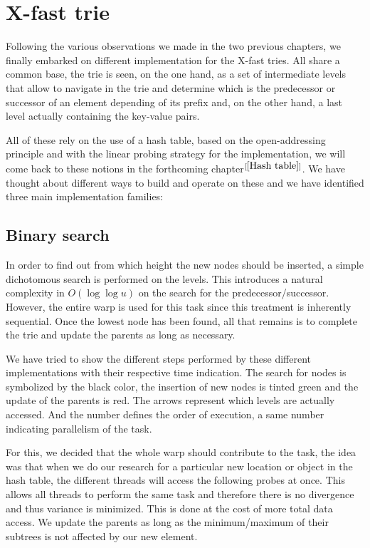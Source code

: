 
\section{X-fast trie}

Following the various observations we made in the two previous chapters, we finally embarked on different implementation for the X-fast tries. All share a common base, the trie is seen, on the one hand, as a set of intermediate levels that allow to navigate in the trie and determine which is the predecessor or successor of an element depending of its prefix and, on the other hand, a last level actually containing the key-value pairs.

All of these rely on the use of a hash table, based on the open-addressing principle and with the linear probing strategy for the implementation, we will come back to these notions in the forthcoming chapter$ ^{[\ref{Hash table}]}$. We have thought about different ways to build and operate on these and we have identified three main implementation families:

\subsection{Binary search}

In order to find out from which height the new nodes should be inserted, a simple dichotomous search is performed on the levels. This introduces a natural complexity in $O(\log \log u)$ on the search for the predecessor/successor. However, the entire warp is used for this task since this treatment is inherently sequential. Once the lowest node has been found, all that remains is to complete the trie and update the parents as long as necessary.

We have tried to show the different steps performed by these different implementations with their respective time indication. The search for nodes is symbolized by the {\color{black}black} color, the insertion of new nodes is tinted {\color{green}green} and the update of the parents is {\color{red}red}. The arrows represent which levels are actually accessed. And the number defines the order of execution, a same number indicating parallelism of the task.

For this, we decided that the whole warp should contribute to the task, the idea was that when we do our research for a particular new location or object in the hash table, the different threads will access the following probes at once. This allows all threads to perform the same task and therefore there is no divergence and thus variance is minimized. This is done at the cost of more total data access. We update the parents as long as the minimum/maximum of their subtrees is not affected by our new element.

